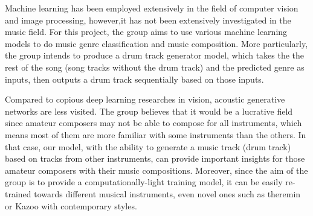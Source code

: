 \begin{par}
    \par \hspace{15pt} Machine learning has been employed extensively in the field of computer vision and image processing, however,it has not been extensively investigated in the music field. For this project, the group aims to use various machine learning models to do music genre classification and music composition. More particularly, the group intends to produce a drum track generator model, which takes the the rest of the song (song tracks without the drum track) and the predicted genre as inputs, then outputs a drum track sequentially based on those inputs.
\end{par}

\begin{par}
    \par \hspace{15pt} Compared to copious deep learning researches in vision, acoustic generative networks are less visited. The group believes that it would be a lucrative field since amateur composers may not be able to compose for all instruments, which means most of them are more familiar with some instruments than the others. In that case, our model, with the ability to generate a music track (drum track) based on tracks from other instruments, can provide important insights for those amateur composers with their music compositions. Moreover, since the aim of the group is to provide a computationally-light training model, it can be easily re-trained towards different musical instruments, even novel ones such as theremin or Kazoo with contemporary styles. 
    
\end{par}
